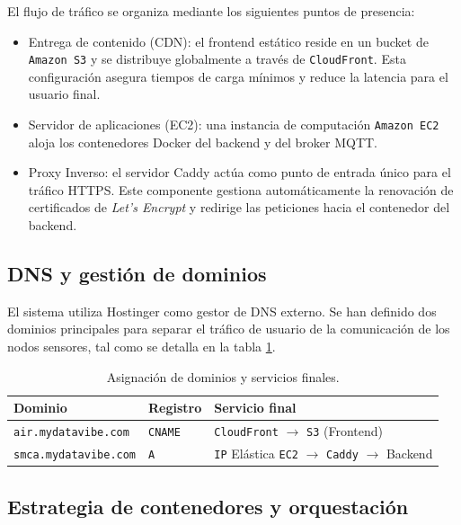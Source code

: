 El flujo de tráfico se organiza mediante los siguientes puntos de presencia:
\begin{itemize}
    \item Entrega de contenido (CDN): el frontend estático reside en un bucket de \texttt{Amazon S3} y se distribuye globalmente a través de \texttt{CloudFront}. Esta configuración asegura tiempos de carga mínimos y reduce la latencia para el usuario final.
    \item Servidor de aplicaciones (EC2): una instancia de computación \texttt{Amazon EC2} aloja los contenedores Docker del backend y del broker MQTT.
    \item Proxy Inverso: el servidor Caddy actúa como punto de entrada único para el tráfico HTTPS. Este componente gestiona automáticamente la renovación de certificados de \textit{Let's Encrypt} y redirige las peticiones hacia el contenedor del backend.
\end{itemize}

\subsection{DNS y gestión de dominios}

El sistema utiliza Hostinger como gestor de DNS externo. Se han definido dos dominios principales para separar el tráfico de usuario de la comunicación de los nodos sensores, tal como se detalla en la tabla \ref{tab:dns-dominios}.

\begin{table}[h]
    \centering
    \caption[Configuración de registros DNS]{Asignación de dominios y servicios finales.}
    \label{tab:dns-dominios}
    \begin{tabular}{p{4.5cm} p{2cm} p{5.5cm}}
        \toprule
        \textbf{Dominio} & \textbf{Registro} & \textbf{Servicio final} \\
        \midrule
        \texttt{air.mydatavibe.com} & \texttt{CNAME} & \texttt{CloudFront} $\rightarrow$ \texttt{S3} (Frontend) \\
        \texttt{smca.mydatavibe.com} & \texttt{A} & \texttt{IP} Elástica \texttt{EC2} $\rightarrow$ \texttt{Caddy} $\rightarrow$ Backend \\
        \bottomrule
    \end{tabular}
\end{table}

\subsection{Estrategia de contenedores y orquestación}

